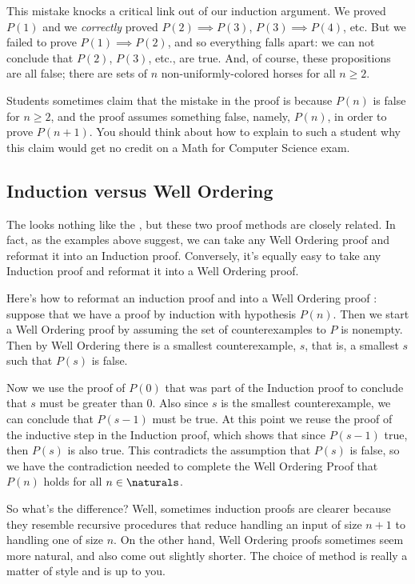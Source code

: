 This mistake knocks a critical link out of our induction argument.  We
proved $P(1)$ and we \emph{correctly} proved $P(2) \implies P(3)$, $P(3)
\implies P(4)$, etc.  But we failed to prove $P(1) \implies P(2)$, and so
everything falls apart: we can not conclude that $P(2)$, $P(3)$, etc., are
true.  And, of course, these propositions are all false; there are
sets of $n$ non-uniformly-colored horses for all $n \ge 2$.

Students sometimes claim that the mistake in the proof is because
$P(n)$ is false for $n \geq 2$, and the proof assumes something false,
namely, $P(n)$, in order to prove $P(n+1)$.  You should think about
how to explain to such a student why this claim would get no credit on
a Math for Computer Science exam.

\subsection{Induction versus Well Ordering}\label{versusWO}

The  looks nothing like the , but these two proof methods are closely related.  In fact,
as the examples above suggest, we can take any Well Ordering proof and
reformat it into an Induction proof.  Conversely, it's equally easy to
take any Induction proof and reformat it into a Well Ordering proof.

\begin{editingnotes}
Here's how to reformat an induction proof and into a Well
Ordering proof : suppose that we have a proof by induction with
hypothesis $P(n)$.  Then we start a Well Ordering proof by assuming the
set of counterexamples to $P$ is nonempty.  Then by Well Ordering there is
a smallest counterexample, $s$, that is, a smallest $s$ such that $P(s)$
is false.

Now we use the proof of $P(0)$ that was part of the Induction proof to
conclude that $s$ must be greater than 0.  Also since $s$ is the smallest
counterexample, we can conclude that $P(s-1)$ must be true.  At this point
we reuse the proof of the inductive step in the Induction proof, which
shows that since $P(s-1)$ true, then $P(s)$ is also true.  This
contradicts the assumption that $P(s)$ is false, so we have the
contradiction needed to complete the Well Ordering Proof that $P(n)$ holds
for all $n \in \naturals$.
\end{editingnotes}

So what's the difference?  Well, sometimes induction proofs are clearer
because they resemble recursive procedures that reduce handling an input
of size $n+1$ to handling one of size $n$.  On the other hand, Well
Ordering proofs sometimes seem more natural, and also come out slightly
shorter.  The choice of method is really a matter of style and is up
to you.


